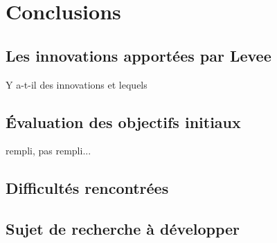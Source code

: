 \chapter{Conclusions}
\label{chap:conclusions}

\section{Les innovations apportées par Levee}

Y a-t-il des innovations et lequels

\section{Évaluation des objectifs initiaux}

rempli, pas rempli...

\section{Difficultés rencontrées}

\section{Sujet de recherche à développer}
